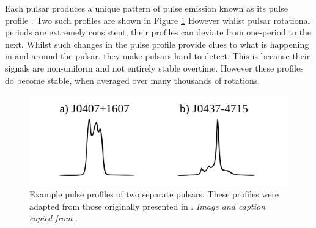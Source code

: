 Each pulsar produces a unique pattern of pulse emission known as its pulse profile \citep{lorimer2008}. Two such profiles are shown in Figure \ref{fig:fig-3} However whilst pulsar rotational periods are extremely consistent, their profiles can deviate from one-period to the next. Whilst such changes in the pulse profile provide clues to what is happening in and around the pulsar, they make pulsars hard to detect. This is because their signals are non-uniform and not entirely stable overtime. However these profiles do become stable, when averaged over many thousands of rotations.
\begin{figure}[!h]
\centering
\includegraphics[scale=0.4]{figures/fig-3}
\caption[Pulse profiles of two separate pulsars]{Example pulse profiles of two separate pulsars. These profiles were adapted from those originally presented in \citep{lorimer}.  \textit{Image and caption copied from} \citep{lyon}.}	
\label{fig:fig-3}
\end{figure}

